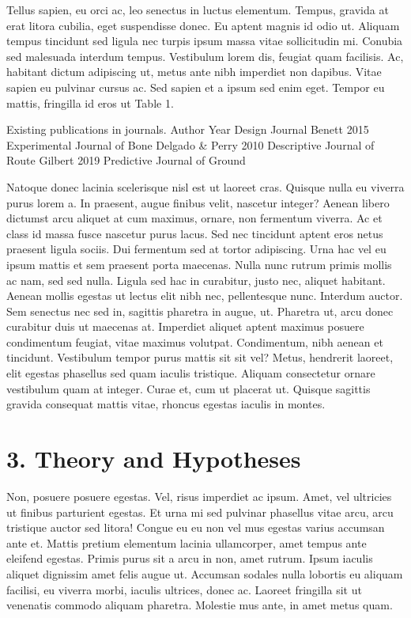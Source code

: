 \documentclass[
  12,
]{article}
\begin{document}
Tellus sapien, eu orci ac, leo senectus in luctus elementum. Tempus,
gravida at erat litora cubilia, eget suspendisse donec. Eu aptent magnis
id odio ut. Aliquam tempus tincidunt sed ligula nec turpis ipsum massa
vitae sollicitudin mi. Conubia sed malesuada interdum tempus. Vestibulum
lorem dis, feugiat quam facilisis. Ac, habitant dictum adipiscing ut,
metus ante nibh imperdiet non dapibus. Vitae sapien eu pulvinar cursus
ac. Sed sapien et a ipsum sed enim eget. Tempor eu mattis, fringilla id
eros ut Table 1.

Existing publications in journals. Author Year Design Journal Benett
2015 Experimental Journal of Bone Delgado \& Perry 2010 Descriptive
Journal of Route Gilbert 2019 Predictive Journal of Ground

Natoque donec lacinia scelerisque nisl est ut laoreet cras. Quisque
nulla eu viverra purus lorem a. In praesent, augue finibus velit,
nascetur integer? Aenean libero dictumst arcu aliquet at cum maximus,
ornare, non fermentum viverra. Ac et class id massa fusce nascetur purus
lacus. Sed nec tincidunt aptent eros netus praesent ligula sociis. Dui
fermentum sed at tortor adipiscing. Urna hac vel eu ipsum mattis et sem
praesent porta maecenas. Nulla nunc rutrum primis mollis ac nam, sed sed
nulla. Ligula sed hac in curabitur, justo nec, aliquet habitant. Aenean
mollis egestas ut lectus elit nibh nec, pellentesque nunc. Interdum
auctor. Sem senectus nec sed in, sagittis pharetra in augue, ut.
Pharetra ut, arcu donec curabitur duis ut maecenas at. Imperdiet aliquet
aptent maximus posuere condimentum feugiat, vitae maximus volutpat.
Condimentum, nibh aenean et tincidunt. Vestibulum tempor purus mattis
sit sit vel? Metus, hendrerit laoreet, elit egestas phasellus sed quam
iaculis tristique. Aliquam consectetur ornare vestibulum quam at
integer. Curae et, cum ut placerat ut. Quisque sagittis gravida
consequat mattis vitae, rhoncus egestas iaculis in montes.

\hypertarget{theory-and-hypotheses}{%
\section{3. Theory and Hypotheses}\label{theory-and-hypotheses}}

Non, posuere posuere egestas. Vel, risus imperdiet ac ipsum. Amet, vel
ultricies ut finibus parturient egestas. Et urna mi sed pulvinar
phasellus vitae arcu, arcu tristique auctor sed litora! Congue eu eu non
vel mus egestas varius accumsan ante et. Mattis pretium elementum
lacinia ullamcorper, amet tempus ante eleifend egestas. Primis purus sit
a arcu in non, amet rutrum. Ipsum iaculis aliquet dignissim amet felis
augue ut. Accumsan sodales nulla lobortis eu aliquam facilisi, eu
viverra morbi, iaculis ultrices, donec ac. Laoreet fringilla sit ut
venenatis commodo aliquam pharetra. Molestie mus ante, in amet metus
quam.
\end{document}
